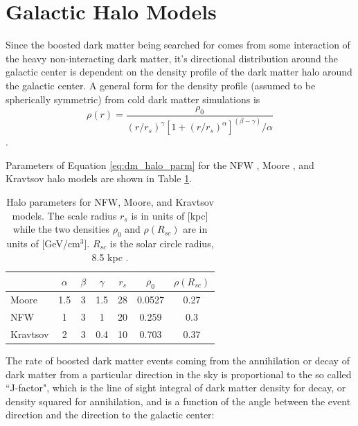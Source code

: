 \section{Galactic Halo Models}
\label{sec:halo_models}
\graphicspath{{Boosted_dm/}}
Since the boosted dark matter being searched for comes from some interaction of the heavy non-interacting dark matter, it's directional distribution around the galactic center is dependent on the density profile of the dark matter halo around the galactic center.  A general form for the density profile (assumed to be spherically symmetric) from cold dark matter simulations is \cite{Yuksel:2007jx}
\begin{equation}
\rho(r)=\frac{\rho_0}{(r/r_s)^\gamma [1+(r/r_s)^\alpha]^(\beta-\gamma)/\alpha}
\label{eq:dm_halo_parm}
\end{equation}.



Parameters of Equation \ref{eq:dm_halo_parm} for the NFW \cite{Navarro:1996ce}, Moore \cite{Moore:1999kx}, and Kravtsov \cite{Kravtsov:1998it} halo models are shown in Table \ref{tab:halo_parms}.
\begin{table}[ht]
\begin{tabular}{lcccccc}
\hline\hline
&$\alpha$&$\beta$&$\gamma$&$r_s$&   $\rho_0$ &   $\rho(R_{sc})$ \\
\hline
Moore & 1.5&3&1.5&28&0.0527&0.27\\
NFW&1&3&1&20&0.259&0.3\\
Kravtsov&2&3&0.4&10&0.703&0.37\\
\hline
\end{tabular}

\caption{Halo parameters for NFW, Moore, and Kravtsov models.  The scale radius $r_s$ is in units of [kpc] while the two densities $\rho_0$ and  $\rho(R_{sc})$ are in units of [GeV/cm$^3$].  $R_{sc}$ is the solar circle radius, 8.5 kpc  \cite{Yuksel:2007jx}.}
\label{tab:halo_parms}
\end{table}

The rate of boosted dark matter events coming from the annihilation or decay of dark matter from a particular direction in the sky is proportional to the so called ``J-factor", which is the line of sight integral of dark matter density for decay, or density squared for annihilation, and is a function of the angle between the event direction and the direction to the galactic center:

